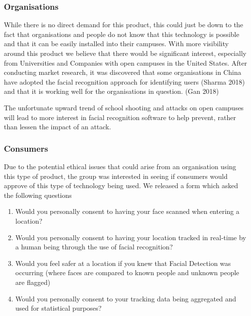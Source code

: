 \documentclass[
  english,
  a4paper,
,tablecaptionabove
]{scrartcl}
\providecommand{\tightlist}{%
  \setlength{\itemsep}{0pt}\setlength{\parskip}{0pt}}
\begin{document}
\hypertarget{organisations}{%
\subsubsection{Organisations}\label{organisations}}

While there is no direct demand for this product, this could just be
down to the fact that organisations and people do not know that this
technology is possible and that it can be easily installed into their
campuses. With more visibility around this product we believe that there
would be significant interest, especially from Universities and
Companies with open campuses in the United States. After conducting
market research, it was discovered that some organisations in China have
adopted the facial recognition approach for identifying users (Sharma
2018) and that it is working well for the organisations in question.
(Gan 2018)

The unfortunate upward trend of school shooting and attacks on open
campuses will lead to more interest in facial recognition software to
help prevent, rather than lessen the impact of an attack.

\hypertarget{consumers}{%
\subsubsection{Consumers}\label{consumers}}

Due to the potential ethical issues that could arise from an
organisation using this type of product, the group was interested in
seeing if consumers would approve of this type of technology being used.
We released a form which asked the following questions

\begin{enumerate}
\def\labelenumi{\arabic{enumi}.}
\tightlist
\item
  Would you personally consent to having your face scanned when entering
  a location?
\item
  Would you personally consent to having your location tracked in
  real-time by a human being through the use of facial recognition?
\item
  Would you feel safer at a location if you knew that Facial Detection
  was occurring (where faces are compared to known people and unknown
  people are flagged)
\item
  Would you personally consent to your tracking data being aggregated
  and used for statistical purposes?
\end{enumerate}
\end{document}
